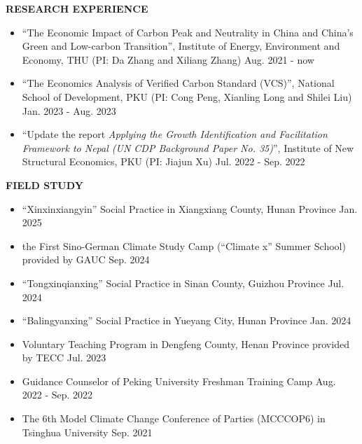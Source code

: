 \documentclass[UTF8]{ctexbook}
\begin{document}
\vspace{12pt}

\begin{center}
    \textbf{RESEARCH EXPERIENCE}
\end{center}


\begin{itemize}
    \item ``The Economic Impact of Carbon Peak and Neutrality in China and China's Green and Low-carbon Transition'', Institute of Energy, Environment and Economy, THU (PI: Da Zhang and Xiliang Zhang) \hfill Aug. 2021 - now
    \item ``The Economics Analysis of Verified Carbon Standard (VCS)'', National School of Development, PKU (PI: Cong Peng, Xianling Long and Shilei Liu) \hfill Jan. 2023 - Aug. 2023
    \item ``Update the report \textit{Applying the Growth Identification and Facilitation Framework to Nepal (UN CDP Background Paper No. 35)}'', Institute of New Structural Economics, PKU (PI: Jiajun Xu) \hfill Jul. 2022 - Sep. 2022
\end{itemize}

\vspace{12pt}

\begin{center}
    \textbf{FIELD STUDY}
\end{center}


\begin{itemize}
    \item ``Xinxinxiangyin'' Social Practice in Xiangxiang County, Hunan Province \hfill Jan. 2025
    \item the First Sino-German Climate Study Camp (``Climate x'' Summer School) provided by GAUC \hfill Sep. 2024
    \item ``Tongxinqianxing'' Social Practice in Sinan County, Guizhou Province \hfill Jul. 2024
    \item ``Balingyanxing'' Social Practice in Yueyang City, Hunan Province \hfill Jan. 2024
    \item Voluntary Teaching Program in Dengfeng County, Henan Province provided by TECC  \hfill Jul. 2023
    \item Guidance Counselor of Peking University Freshman Training Camp \hfill Aug. 2022 - Sep. 2022
    \item The 6th Model Climate Change Conference of Parties (MCCCOP6) in Tsinghua University \hfill Sep. 2021
\end{itemize}
\end{document}
